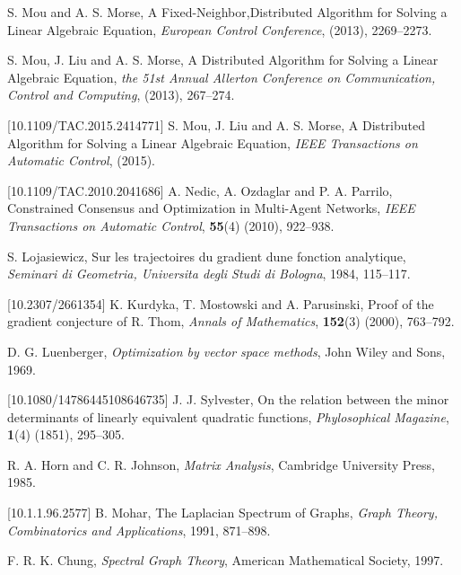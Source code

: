 \documentclass{aims}
\begin{document}
\begin{thebibliography}{99}
    \newblock S. Mou and A. S. Morse, \newblock A Fixed-Neighbor,Distributed Algorithm for Solving a Linear Algebraic Equation,
    \newblock \emph{European Control Conference}, (2013), 2269--2273.

    \newblock S. Mou, J. Liu and A. S. Morse, \newblock A Distributed Algorithm for Solving a Linear Algebraic Equation,
    \newblock \emph{the 51st Annual Allerton Conference on Communication, Control and Computing}, (2013), 267--274.

 [10.1109/TAC.2015.2414771]
    \newblock S. Mou, J. Liu and A. S. Morse, \newblock A Distributed Algorithm for Solving a Linear Algebraic Equation,
    \newblock \emph{IEEE Transactions on Automatic Control}, (2015).

 [10.1109/TAC.2010.2041686]
    \newblock A. Nedic, A. Ozdaglar and P. A. Parrilo, \newblock Constrained Consensus and Optimization in Multi-Agent Networks,
    \newblock \emph{IEEE Transactions on Automatic Control}, \textbf{55}(4) (2010), 922--938.

    \newblock S. Lojasiewicz, \newblock Sur les trajectoires du gradient dune fonction analytique,
    \newblock \emph{Seminari di Geometria, Universita degli Studi di Bologna}, 1984, 115--117.

 [10.2307/2661354]
    \newblock K. Kurdyka, T. Mostowski and A. Parusinski, \newblock Proof of the gradient conjecture of R. Thom,
    \newblock \emph{Annals of Mathematics}, \textbf{152}(3) (2000), 763--792.

     \newblock D. G. Luenberger,
     \newblock \emph{Optimization by vector space methods},
     \newblock John Wiley and Sons, 1969.


 [10.1080/14786445108646735]
    \newblock J. J. Sylvester, \newblock On the relation between the minor determinants of linearly equivalent quadratic functions,
    \newblock \emph{Phylosophical Magazine}, \textbf{1}(4) (1851), 295--305.

     \newblock R. A. Horn and C. R. Johnson,
     \newblock \emph{Matrix Analysis},
     \newblock Cambridge University Press, 1985.

 [10.1.1.96.2577]
    \newblock B. Mohar, \newblock The Laplacian Spectrum of Graphs,
    \newblock \emph{Graph Theory, Combinatorics and Applications}, 1991, 871--898.

     \newblock F. R. K. Chung,
     \newblock \emph{Spectral Graph Theory},
     \newblock American Mathematical Society, 1997.


\end{thebibliography}
\end{document}
